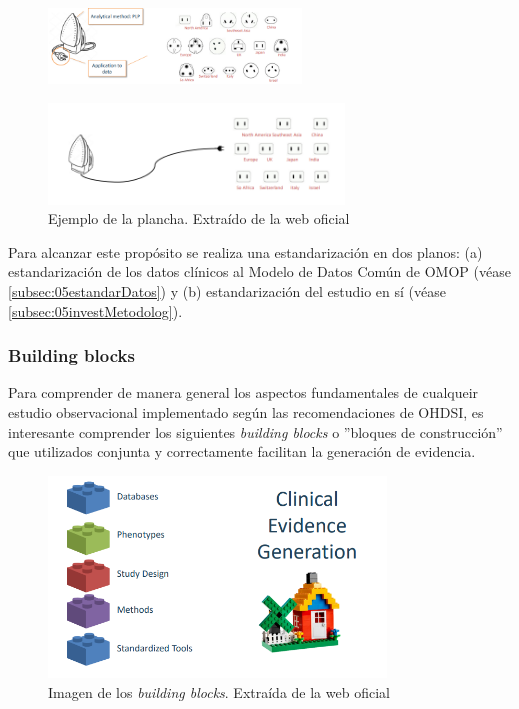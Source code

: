 \begin{figure}[H]
    \centering
    \includegraphics[width=0.60\textwidth]{figures/plancha1.png}
    \label{fig:plancha1}
\end{figure}
\begin{figure}[H]
    \centering
    \includegraphics[width=0.70\textwidth]{figures/plancha2.png}
     \caption{Ejemplo de la plancha. Extraído de la web oficial \cite{OHDSIwebsite}}
    \label{fig:plancha2}
\end{figure}

Para alcanzar este propósito se realiza una estandarización en dos planos: (a) estandarización de los datos clínicos al Modelo de Datos Común de OMOP (véase \ref{subsec:05estandarDatos}) y (b) estandarización del estudio en sí (véase \ref{subsec:05investMetodolog}). 

\subsubsection{Building blocks}

Para comprender de manera general los aspectos fundamentales de cualqueir estudio observacional implementado según las recomendaciones de OHDSI, es interesante comprender los siguientes \textit{building blocks} o ''bloques de construcción'' que utilizados conjunta y correctamente facilitan la generación de evidencia. 

\begin{figure}[H]
\centering
\includegraphics[width=0.80\textwidth]{figures/buildingBlocks.png}
     \caption{Imagen de los \textit{building blocks}. Extraída de la web oficial \cite{OHDSIwebsite}}
    \label{fig:buildingBlocks}
\end{figure}

